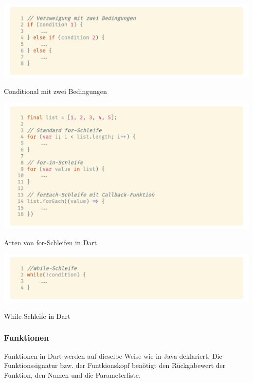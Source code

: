 \begin{code}
    \centering
    \includegraphics[width=1\textwidth]{images/Dart/dartConditional.png}
    \caption{Conditional mit zwei Bedingungen}
\end{code}

\begin{code}
    \centering
    \includegraphics[width=1\textwidth]{images/Dart/dartForLoop.png}
    \caption{Arten von for-Schleifen in Dart}
\end{code}

\begin{code}
    \centering
    \includegraphics[width=1\textwidth]{images/Dart/dartWhileLoops.png}
    \caption{While-Schleife in Dart}
\end{code}

\newpage

\subsubsection{Funktionen}

Funktionen in Dart werden auf dieselbe Weise wie in Java deklariert. Die Funktionssignatur 
bzw. der Funtkionskopf benötigt den Rückgabewert der Funktion, den Namen und die Parameterliste.

